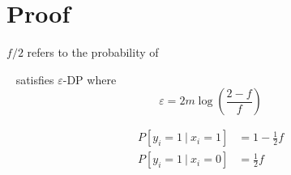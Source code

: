 \documentclass{article}
\begin{document}
\section{Proof}
$f/2$ refers to the probability of 
\begin{theorem}~\cite{rappor}
	 satisfies $\varepsilon$-DP where 
	\begin{equation}
		\varepsilon = 2m\log\left(\frac{2-f}{f}\right)
	\end{equation}
\end{theorem}
\begin{lemma}
	\begin{align}
		P[y_i = 1~|~x_i=1] &= 1 - \frac{1}{2}f\\
		P[y_i = 1~|~x_i=0] &=\frac{1}{2}f
	\end{align}
\end{lemma}
\end{document}
